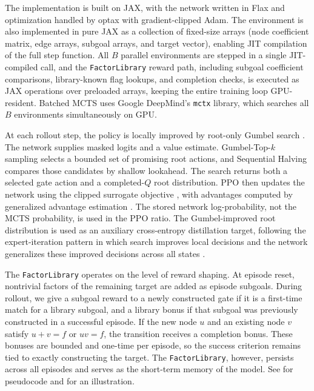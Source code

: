 \documentclass{article}
\theoremstyle{definition}
\theoremstyle{remark}
\begin{document}
The implementation is built on JAX, with the network written in Flax and optimization handled by optax with gradient-clipped Adam. The environment is also implemented in pure JAX as a collection of fixed-size arrays (node coefficient matrix, edge arrays, subgoal arrays, and target vector), enabling JIT compilation of the full step function. All $B$ parallel environments are stepped in a single JIT-compiled call, and the \texttt{FactorLibrary} reward path, including subgoal coefficient comparisons, library-known flag lookups, and completion checks, is executed as JAX operations over preloaded arrays, keeping the entire training loop GPU-resident. Batched MCTS uses Google DeepMind's \texttt{mctx} library, which searches all $B$ environments simultaneously on GPU.

At each rollout step, the policy is locally improved by root-only Gumbel search \citep{Danihelka2022GumbelPlanning}. The network supplies masked logits and a value estimate. Gumbel-Top-$k$ sampling selects a bounded set of promising root actions, and Sequential Halving compares those candidates by shallow lookahead. The search returns both a selected gate action and a completed-$Q$ root distribution. PPO then updates the network using the clipped surrogate objective \citep{Schulman2017PPO}, with advantages computed by generalized advantage estimation \citep{Schulman2016GAE}. The stored network log-probability, not the MCTS probability, is used in the PPO ratio. The Gumbel-improved root distribution is used as an auxiliary cross-entropy distillation target, following the expert-iteration pattern in which search improves local decisions and the network generalizes these improved decisions across all states \citep{Anthony2017ExpertIteration,Silver2018AlphaZero}.

The \texttt{FactorLibrary} operates on the level of reward shaping. At episode reset, nontrivial factors of the remaining target are added as episode subgoals. During rollout, we give a subgoal reward to a newly constructed gate if it is a first-time match for a library subgoal, and a library bonus if that subgoal was previously constructed in a successful episode. If the new node $u$ and an existing node $v$ satisfy $u+v=f$ or $uv=f$, the transition receives a completion bonus. These bonuses are bounded and one-time per episode, so the success criterion remains tied to exactly constructing the target. The \texttt{FactorLibrary}, however, persists across all episodes and serves as the short-term memory of the model. See  for pseudocode and  for an illustration. 
\end{document}
